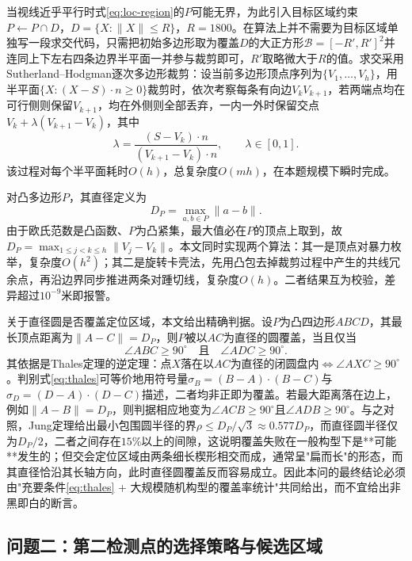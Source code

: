 \documentclass[12pt,a4paper]{ctexart}
\begin{document}
当视线近乎平行时式\eqref{eq:loc-region}的$P$可能无界，为此引入目标区域约束$P\leftarrow P\cap D$，$D=\{X:\lVert X\rVert\le R\}$，$R=1800$。在算法上并不需要为目标区域单独写一段求交代码，只需把初始多边形取为覆盖$D$的大正方形$\mathcal{B}=[-R',R']^2$并连同上下左右四条边界半平面一并参与裁剪即可，$R'$取略微大于$R$的值。求交采用Sutherland--Hodgman逐次多边形裁剪：设当前多边形顶点序列为$\{V_1,\dots,V_h\}$，用半平面$\{X:(X-S)\cdot n\ge0\}$裁剪时，依次考察每条有向边$V_kV_{k+1}$，若两端点均在可行侧则保留$V_{k+1}$，均在外侧则全部丢弃，一内一外时保留交点$V_k+\lambda(V_{k+1}-V_k)$，其中
\begin{equation}
\lambda=\frac{(S-V_k)\cdot n}{(V_{k+1}-V_k)\cdot n},\qquad \lambda\in[0,1].
\label{eq:clip-lambda}
\end{equation}
该过程对每个半平面耗时$O(h)$，总复杂度$O(mh)$，在本题规模下瞬时完成。

对凸多边形$P$，其直径定义为
\begin{equation}
D_P=\max_{a,b\in P}\lVert a-b\rVert .
\label{eq:diameter-def}
\end{equation}
由于欧氏范数是凸函数、$P$为凸紧集，最大值必在$P$的顶点上取到，故$D_P=\max_{1\le j<k\le h}\lVert V_j-V_k\rVert$。本文同时实现两个算法：其一是顶点对暴力枚举，复杂度$O(h^2)$；其二是旋转卡壳法，先用凸包去掉裁剪过程中产生的共线冗余点，再沿边界同步推进两条对踵切线，复杂度$O(h)$。二者结果互为校验，差异超过$10^{-9}$米即报警。

关于直径圆是否覆盖定位区域，本文给出精确判据。设$P$为凸四边形$ABCD$，其最长顶点距离为$\lVert A-C\rVert=D_P$，则$P$被以$AC$为直径的圆覆盖，当且仅当
\begin{equation}
\angle ABC\ge 90^\circ\quad\text{且}\quad\angle ADC\ge 90^\circ .
\label{eq:thales}
\end{equation}
其依据是Thales定理的逆定理：点$X$落在以$AC$为直径的闭圆盘内$\iff\angle AXC\ge90^\circ$。判别式\eqref{eq:thales}可等价地用符号量$\sigma_{B}=(B-A)\cdot(B-C)$与$\sigma_{D}=(D-A)\cdot(D-C)$描述，二者均非正即为覆盖。若最大距离落在边上，例如$\lVert A-B\rVert=D_P$，则判据相应地变为$\angle ACB\ge90^\circ$且$\angle ADB\ge90^\circ$。与之对照，Jung定理给出最小包围圆半径的界$\rho\le D_P/\sqrt3\approx0.577D_P$，而直径圆半径仅为$D_P/2$，二者之间存在$15\%$以上的间隙，这说明覆盖失败在一般构型下是**可能**发生的；但交会定位区域由两条细长楔形相交而成，通常呈"扁而长"的形态，而其直径恰沿其长轴方向，此时直径圆覆盖反而容易成立。因此本问的最终结论必须由"充要条件\eqref{eq:thales} + 大规模随机构型的覆盖率统计"共同给出，而不宜给出非黑即白的断言。

\subsection{问题二：第二检测点的选择策略与候选区域}
\end{document}
